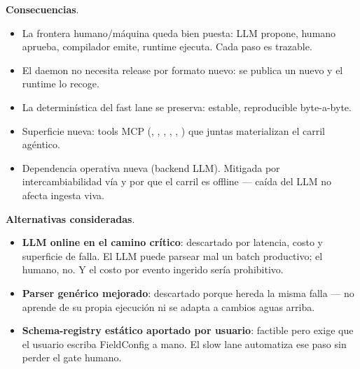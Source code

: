 \textbf{Consecuencias}.

\begin{itemize}
    \item La frontera humano/máquina queda bien puesta: LLM
    propone, humano aprueba, compilador emite, runtime ejecuta. Cada
    paso es trazable.
    \item El daemon no necesita release por formato nuevo: se
    publica un nuevo  y el runtime lo recoge.
    \item La determinística del fast lane se preserva:
     estable, reproducible byte-a-byte.
    \item Superficie nueva: tools MCP
    (, ,
    , ,
    , )
    que juntas materializan el carril agéntico.
    \item Dependencia operativa nueva (backend LLM). Mitigada por
    intercambiabilidad vía  y por que
    el carril es offline — caída del LLM no afecta ingesta viva.
\end{itemize}

\textbf{Alternativas consideradas}.

\begin{itemize}
    \item \textbf{LLM online en el camino crítico}: descartado por
    latencia, costo y superficie de falla. El LLM puede parsear mal
    un batch productivo; el humano, no. Y el costo por evento
    ingerido sería prohibitivo.
    \item \textbf{Parser genérico mejorado}: descartado porque
    hereda la misma falla — no aprende de su propia ejecución ni se
    adapta a cambios aguas arriba.
    \item \textbf{Schema-registry estático aportado por usuario}:
    factible pero exige que el usuario escriba FieldConfig a mano.
    El slow lane automatiza ese paso sin perder el gate humano.
\end{itemize}
